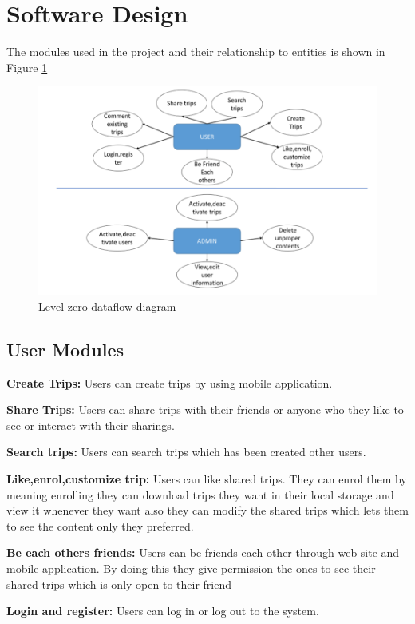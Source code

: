 \newpage
\section{Software Design}

The modules used in the project and their relationship to entities is shown in Figure \ref{fig:eR}
\begin{figure}[!ht]
\centering
\includegraphics[scale=0.6]{projectChapters/images/ER.png}
\caption{Level zero dataflow diagram }
\label{fig:eR}
\end{figure}


\subsection{User Modules}
\textbf{Create Trips:} Users can create trips by using mobile application.

\textbf{Share Trips:} Users can share trips with their friends or anyone who they like to see or interact with their sharings. 

\textbf{Search trips:} Users can search trips which has been created other users.


\textbf{Like,enrol,customize trip:} Users can like shared trips. They can enrol them by meaning enrolling they can download trips they want in their local storage and view it whenever they want also they can modify the shared trips which lets them to see the content only they preferred.

\textbf{Be each others friends:} Users can be friends each other through web site and mobile application. By doing this they give permission the ones to see their shared trips which is only open to their friend

\textbf{Login and register:} Users can log in or log out to the system.

